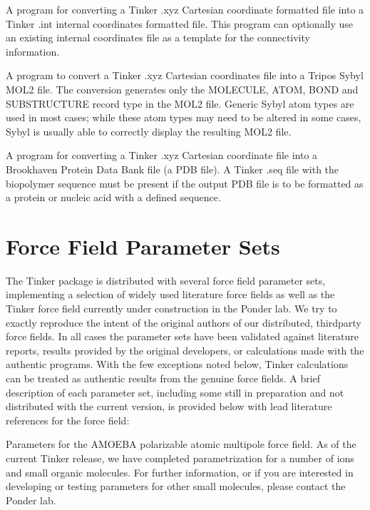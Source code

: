 \documentclass[letterpaper,11pt,english]{sphinxmanual}
\begin{document}

A program for converting a Tinker .xyz Cartesian coordinate formatted file into a Tinker .int internal coordinates formatted file. This program can optionally use an existing internal coordinates file as a template for the connectivity information.


A program to convert a Tinker .xyz Cartesian coordinates file into a Tripos Sybyl MOL2 file. The conversion generates only the MOLECULE, ATOM, BOND and SUBSTRUCTURE record type in the MOL2 file. Generic Sybyl atom types are used in most cases; while these atom types may need to be altered in some cases, Sybyl is usually able to correctly display the resulting MOL2 file.


A program for converting a Tinker .xyz Cartesian coordinate file into a Brookhaven Protein Data Bank file (a PDB file). A Tinker .seq file with the biopolymer sequence must be present if the output PDB file is to be formatted as a protein or nucleic acid with a defined sequence.


\chapter{Force Field Parameter Sets}
\label{\detokenize{text/parameters:force-field-parameter-sets}}\label{\detokenize{text/parameters::doc}}
The Tinker package is distributed with several force field parameter sets, implementing a selection of widely used literature force fields as well as the Tinker force field currently under construction in the Ponder lab. We try to exactly reproduce the intent of the original authors of our distributed, third\sphinxhyphen{}party force fields. In all cases the parameter sets have been validated against literature reports, results provided by the original developers, or calculations made with the authentic programs. With the few exceptions noted below, Tinker calculations can be treated as authentic results from the genuine force fields. A brief description of each parameter set, including some still in preparation and not distributed with the current version, is provided below with lead literature references for the force field:


Parameters for the AMOEBA polarizable atomic multipole force field. As of the current Tinker release, we have completed parametrization for a number of ions and small organic molecules. For further information, or if you are interested in developing or testing parameters for other small molecules, please contact the Ponder lab.
\end{document}
